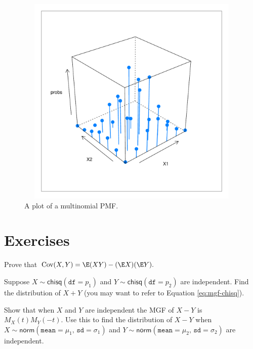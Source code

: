 \documentclass[captions=tableheading]{scrbook}
\begin{document}
\begin{figure}[th]
    \includegraphics[width=5in, height=4in]{img/multinom-pmf2.pdf}
    \caption[Plot of a multinomial PMF.]{\small A plot of a multinomial PMF.}
    \label{fig:multinom-pmf2}
  \end{figure}

\newpage{}
\section{Exercises}
\label{sec-7-10}


\setcounter{thm}{0}

\begin{xca}
Prove that \( \mbox{Cov}(X,Y)=\E(XY)-(\E X)(\E Y). \) \label{xca:Prove-cov-shortcut}
\end{xca}

\begin{xca}
\label{xca:sum-indep-chisq}
Suppose \(X\sim\mathsf{chisq}(\mathtt{df}=p_{1})\) and \(Y\sim\mathsf{chisq}(\mathtt{df}=p_{2})\) are independent. Find the distribution of \(X+Y\) (you may want to refer to Equation \ref{eq:mgf-chisq}).
\end{xca}

\begin{xca}
\label{xca:diff-indep-norm}
Show that when \(X\) and \(Y\) are independent the MGF of \(X-Y\) is \(M_{X}(t)M_{Y}(-t)\). Use this to find the distribution of \(X-Y\) when \(X\sim\mathsf{norm}(\mathtt{mean}=\mu_{1},\,\mathtt{sd}=\sigma_{1})\) and \(Y\sim\mathsf{norm}(\mathtt{mean}=\mu_{2},\,\mathtt{sd}=\sigma_{2})\)  are independent. 
\end{xca}
\end{document}
